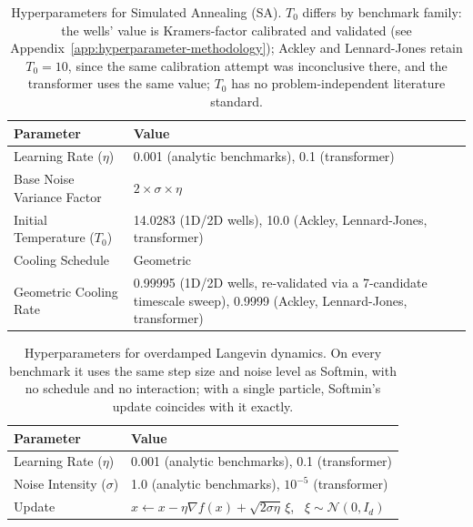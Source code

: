 \documentclass{article}
\theoremstyle{plain}
\theoremstyle{definition}
\theoremstyle{remark}
\begin{document}
\begin{table}[!htbp]
\centering
\caption{Hyperparameters for Simulated Annealing (SA). $T_0$ differs by benchmark family: the wells' value is Kramers-factor calibrated and validated (see Appendix~\ref{app:hyperparameter-methodology}); Ackley and Lennard-Jones retain $T_0=10$, since the same calibration attempt was inconclusive there, and the transformer uses the same value; $T_0$ has no problem-independent literature standard.}
\label{tab:sa_hyperparams}
\begin{tabular}{@{}lp{}@{}}
\toprule
\textbf{Parameter} & \textbf{Value} \\
\midrule
Learning Rate ($\eta$) & 0.001 (analytic benchmarks), 0.1 (transformer) \\
Base Noise Variance Factor & $2 \times \sigma \times \eta$ \\
Initial Temperature ($T_0$) & 14.0283 (1D/2D wells), 10.0 (Ackley, Lennard-Jones, transformer) \\
Cooling Schedule & Geometric \\
Geometric Cooling Rate & 0.99995 (1D/2D wells, re-validated via a 7-candidate timescale sweep), 0.9999 (Ackley, Lennard-Jones, transformer) \\
\bottomrule
\end{tabular}
\end{table}

\begin{table}[!htbp]
\centering
\caption{Hyperparameters for overdamped Langevin dynamics. On every benchmark it uses the same step
size and noise level as Softmin, with no schedule and no interaction; with a single particle,
Softmin's update coincides with it exactly.}
\label{tab:langevin_hyperparams}
\begin{tabular}{@{}ll@{}}
\toprule
\textbf{Parameter} & \textbf{Value} \\
\midrule
Learning Rate ($\eta$) & 0.001 (analytic benchmarks), 0.1 (transformer) \\
Noise Intensity ($\sigma$) & 1.0 (analytic benchmarks), $10^{-5}$ (transformer) \\
Update & $x\gets x-\eta\nabla f(x)+\sqrt{2\sigma\eta}\,\xi$, \ $\xi\sim\mathcal{N}(0,I_d)$ \\
\bottomrule
\end{tabular}
\end{table}
\end{document}
